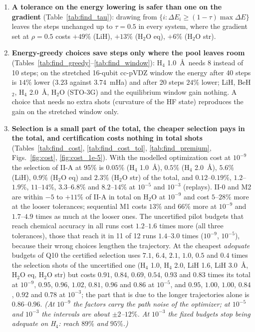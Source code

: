 \documentclass[11pt]{article}
\begin{document}
\begin{enumerate}
        The default $\rho=0.1$ of the paper is the largest value that is harmless on LiH.
  \item \textbf{A tolerance on the energy lowering is safer than one on the gradient} (Table~\ref{tab:find_tau}): drawing from $\{i:\Delta E_i\ge(1-\tau)\max\Delta E\}$ leaves the steps unchanged up to $\tau=0.5$ in every system, where the gradient set at $\rho=0.5$ costs $+49\%$ (LiH), $+13\%$ (H$_2$O eq), $+6\%$ (H$_2$O str).
  \item \textbf{Energy-greedy choices save steps only where the pool leaves room} (Tables~\ref{tab:find_greedy}--\ref{tab:find_window}): H$_4$ 1.0~\AA\ needs 8 instead of 10 steps; on the stretched 16-qubit cc-pVDZ window the energy after 40 steps is $14\%$ lower ($3.23$ against $3.74$~mHa) and
        after 20 steps $24\%$ lower; LiH, BeH$_2$, H$_4$ 2.0~\AA, H$_2$O (STO-3G) and the equilibrium window gain nothing. A choice that needs no extra shots (curvature of the HF state) reproduces the gain on the stretched window only.
  \item \textbf{Selection is a small part of the total, the cheaper selection pays in the total, and certification costs nothing in total shots} (Tables~\ref{tab:find_cost}, \ref{tab:find_cost_tol}, \ref{tab:find_premium}, Figs.~\ref{fig:cost}, \ref{fig:cost_1e-5}). With the modelled optimization cost at $10^{-9}$ the selection of II-A at 95\% is $0.05\%$ (H$_4$ 1.0~\AA), $0.5\%$ (H$_4$ 2.0~\AA), $5.6\%$ (LiH), $0.9\%$ (H$_2$O eq) and $2.3\%$ (H$_2$O str) of the total, and $0.12$--$0.19\%$, $1.2$--$1.9\%$, $11$--$14\%$, $3.3$--$6.8\%$ and $8.2$--$14\%$ at $10^{-5}$ and $10^{-3}$ (replays).
        II-0 and M2 are within $-5$ to $+11\%$ of II-A in total on H$_2$O at $10^{-9}$ and cost $5$--$28\%$ more at the looser tolerances; sequential M1 costs $13\%$ and $66\%$ more at $10^{-9}$ and $1.7$--$4.9$ times as much at the looser ones. The uncertified pilot budgets that reach chemical accuracy in all runs cost $1.2$--$1.6$ times more (all three tolerances), those that reach it in 11 of 12 runs $1.4$--$3.0$ times ($10^{-9}$, $10^{-5}$), because their wrong choices lengthen the trajectory.
        At the cheapest \emph{adequate} budgets of Q10 the certified selection uses $7.1$, $6.4$, $2.1$, $1.0$, $0.5$ and $0.4$ times the selection shots of the uncertified one (H$_4$ 1.0, H$_4$ 2.0, LiH 1.6, LiH 3.0~\AA, H$_2$O eq, H$_2$O str) but costs $0.91$, $0.84$, $0.69$, $0.54$, $0.93$ and $0.83$ times its total at $10^{-9}$, $0.95$, $0.96$, $1.02$, $0.81$, $0.96$ and $0.86$ at $10^{-5}$, and $0.95$, $1.00$, $1.00$, $0.84$, $0.92$ and $0.78$ at $10^{-3}$; the part that is due to the longer trajectories alone is $0.86$--$0.96$. \emph{(At $10^{-9}$ the factors carry the path noise of the optimizer; at $10^{-5}$ and $10^{-3}$ the intervals are about $\pm2$--$12\%$. At $10^{-3}$ the fixed budgets stop being adequate on H$_4$: reach $89\%$ and $95\%$.)}

\end{enumerate}
\end{document}
